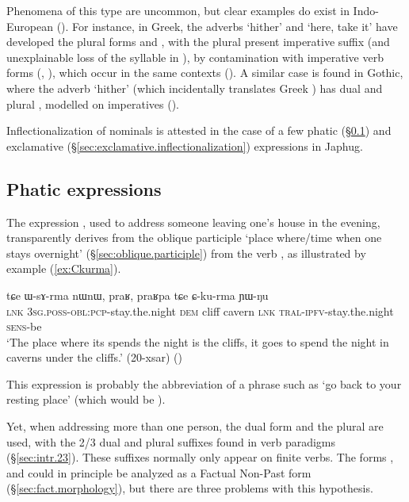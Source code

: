 Phenomena of this type are uncommon, but clear examples do exist in Indo-European (\citealt[414]{pott1859}). For instance, in Greek, the adverbs  `hither' and  `here, take it' have developed the plural forms  and , with the plural present imperative suffix  (and unexplainable loss of the syllable  in ), by contamination with imperative verb forms (, ), which occur in the same contexts (\citealt[113--114]{viti15wandel}).  A similar case is found in Gothic, where the adverb  `hither' (which incidentally translates Greek ) has dual  and plural , modelled on imperatives (\citealt[104]{braune53gotische}).

Inflectionalization of nominals is attested in the case of a few phatic  (§\ref{sec:phatic.inflectionalization}) and exclamative (§\ref{sec:exclamative.inflectionalization}) expressions in Japhug.

\subsection{Phatic expressions} \label{sec:phatic.inflectionalization}
The  expression , used to address someone leaving one's house in the evening, transparently derives from the oblique participle  `place where/time when one stays overnight' (§\ref{sec:oblique.participle}) from the verb , as illustrated by example (\ref{ex:Ckurma}).  

\begin{exe}
\ex \label{ex:Ckurma}
\gll tɕe ɯ-sɤ-rma nɯnɯ, praʁ, praʁpa tɕe ɕ-ku-rma ɲɯ-ŋu \\
\textsc{lnk} \textsc{3sg}.\textsc{poss}-\textsc{obl}:\textsc{pcp}-stay.the.night \textsc{dem} cliff cavern \textsc{lnk} \textsc{tral}-\textsc{ipfv}-stay.the.night \textsc{sens}-be \\
\glt `The place where its spends the night is the cliffs, it goes to spend the night in caverns under the cliffs.' (20-xsar)
()
\end{exe}

This expression is probably the abbreviation of a phrase such as `go back to your resting place' (which would be ).

Yet, when addressing more than one person, the dual form   and the plural   are used, with the 2/3 dual  and plural  suffixes found in verb paradigms (§\ref{sec:intr.23}). These suffixes normally only appear on finite verbs. The forms ,  and  could in principle be analyzed as a Factual Non-Past form (§\ref{sec:fact.morphology}), but there are three problems with this hypothesis. 

